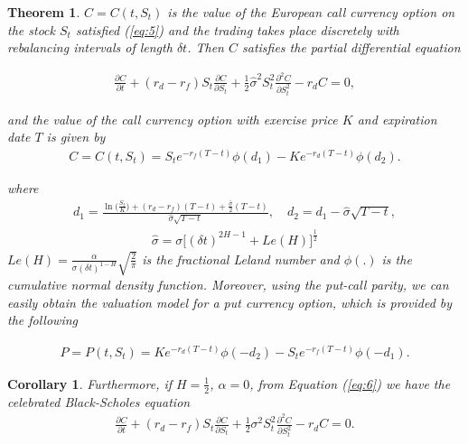 \documentclass[a4paper,11pt]{amsart}
\numberwithin{equation}{section}
\theoremstyle{definition}
\theoremstyle{plain}
\newtheorem{thm}{Theorem}[section]
\newtheorem{cor}{Corollary}[section]
\theoremstyle{definition}
\newcommand{\1}{\mathbf{1}}
\begin{document}
\begin{thm}
$C=C(t, S_t)$ is the value of the European call currency option on the stock $S_t$ satisfied  (\ref{eq:5}) and the trading takes place discretely with rebalancing intervals of length $\delta t$. Then $C$ satisfies the partial differential equation

\begin{eqnarray}
\frac{\partial C}{\partial t}+(r_d-r_f)S_t\frac{\partial C}{\partial S_t}+\frac{1}{2}\widehat{\sigma}^2S_t^2\frac{\partial^2C}{\partial S_t^2}-r_dC=0,
\label{eq:6}
\end{eqnarray}


and the value of the call currency option with exercise  price $K$ and expiration date $T$ is given by
\begin{eqnarray}
C=C(t,S_t)=S_te^{-r_f(T-t)} \phi(d_1)-Ke^{-r_d(T-t)}\phi(d_2).
\label{eq:7}
\end{eqnarray}

where
\begin{eqnarray}
d_1=\frac{\ln\Big(\frac{S_t}{K}\Big)+(r_d-r_f)(T-t)+\frac{\widehat{\sigma}}{2}(T-t)}{\widehat{\sigma}\sqrt{T-t}},\quad d_2=d_1-\widehat{\sigma}\sqrt{T-t},
\label{eq:9}
\end{eqnarray}
\begin{eqnarray}
\widehat{\sigma}=\sigma\Big[(\delta t)^{2H-1}+Le(H)\Big]^{\frac{1}{2}}
\label{eq:10}
\end{eqnarray}
$Le(H)=\frac{\alpha}{\sigma(\delta t)^{1-H}}\sqrt{\frac{2}{\pi}}$ is the fractional Leland number \cite{leland}and $ \phi(.)$ is the cumulative normal density function.
Moreover, using the put-call parity, we can easily obtain the valuation model for a put currency option, which is provided
by the following

\begin{eqnarray}
P=P(t,S_t)=Ke^{-r_d(T-t)}\phi(-d_2)-S_te^{-r_f(T-t)} \phi(-d_1).
\label{eq:8}
\end{eqnarray}
\label{p:2}
\end{thm}


\begin{cor}
Furthermore, if $H=\frac{1}{2}$, $\alpha=0$, from Equation (\ref{eq:6}) we have the celebrated Black-Scholes equation
\begin{eqnarray}
\frac{\partial C}{\partial t}+(r_d-r_f)S_t\frac{\partial C}{\partial S_t}+\frac{1}{2}\sigma^2S_t^2\frac{\partial^2C}{\partial S_t^2}-r_dC=0.
\label{eq:11}
\end{eqnarray}
\end{cor}
\end{document}
